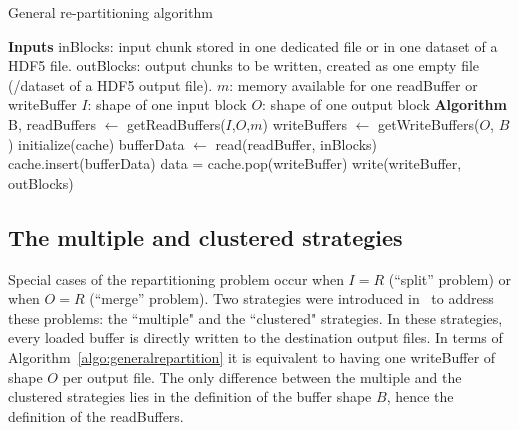 \documentclass[conference]{IEEEtran}
\begin{document}
\begin{algorithm}
  \caption{General re-partitioning algorithm}
  \label{algo:generalrepartition}
  \begin{algorithmic}[1]
    \STATE \textbf{Inputs}
    \STATE inBlocks: input chunk stored in one dedicated file or in one dataset of a HDF5 file.
    \STATE outBlocks: output chunks to be written, created as one empty file (/dataset of a HDF5 output file).
    \STATE $m$: memory available for one readBuffer or writeBuffer
    \STATE $I$: shape of one input block
    \STATE $O$: shape of one output block
    \STATE
    \STATE \textbf{Algorithm}
    \STATE B, readBuffers $\leftarrow$ getReadBuffers($I$,$O$,$m$)
    \STATE writeBuffers $\leftarrow$ getWriteBuffers($O$, $B$)
    \STATE initialize(cache)
      \STATE bufferData $\leftarrow$ read(readBuffer, inBlocks)
      \STATE cache.insert(bufferData)
          \STATE data = cache.pop(writeBuffer)
          \STATE write(writeBuffer, outBlocks)
        \ENDIF
      \ENDFOR
    \ENDFOR

  \end{algorithmic}
\end{algorithm}

\subsection{The multiple and clustered strategies}
Special cases of the repartitioning problem occur when $I=R$ (``split'' problem)
or when $O=R$ (``merge'' problem). Two strategies were introduced
in~\cite{seqalgorithms} to address these problems: the ``multiple" and the
``clustered" strategies. In these strategies, every loaded buffer is directly written to the
destination output files. In terms of Algorithm~\ref{algo:generalrepartition}
it is equivalent to having one writeBuffer of shape $O$ per output file.
The only difference between the multiple and the clustered strategies lies in
the definition of the buffer shape $B$, hence the definition of the readBuffers.
\end{document}
